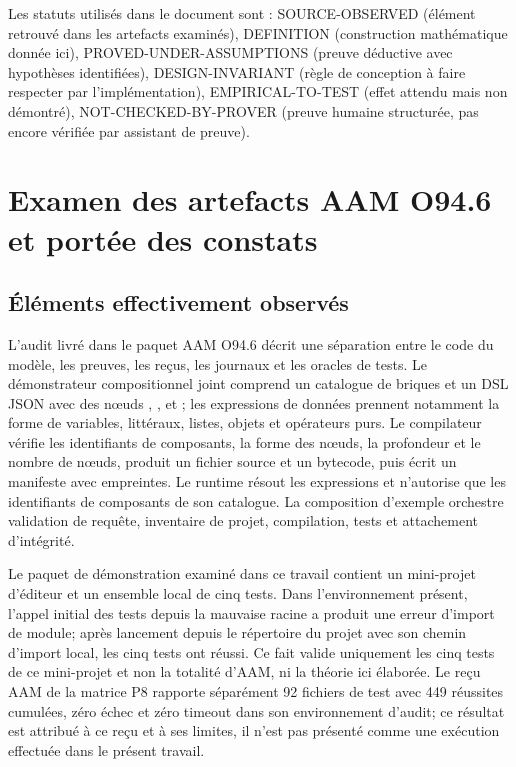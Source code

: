 \documentclass[11pt,a4paper]{article}
\newcommand{\code}[1]{\path{#1}}
\newcommand{\kw}[1]{\textsf{#1}}
\theoremstyle{definition}
\theoremstyle{plain}
\theoremstyle{remark}
\begin{document}
Les statuts utilisés dans le document sont : \kw{SOURCE-OBSERVED} (élément retrouvé dans les artefacts examinés), \kw{DEFINITION} (construction mathématique donnée ici), \kw{PROVED-UNDER-ASSUMPTIONS} (preuve déductive avec hypothèses identifiées), \kw{DESIGN-INVARIANT} (règle de conception à faire respecter par l'implémentation), \kw{EMPIRICAL-TO-TEST} (effet attendu mais non démontré), \kw{NOT-CHECKED-BY-PROVER} (preuve humaine structurée, pas encore vérifiée par assistant de preuve).

\section{Examen des artefacts AAM O94.6 et portée des constats}
\subsection{Éléments effectivement observés}
L'audit livré dans le paquet AAM O94.6 décrit une séparation entre le code du modèle, les preuves, les reçus, les journaux et les oracles de tests. Le démonstrateur compositionnel joint comprend un catalogue de briques et un DSL JSON avec des nœuds \code{invoke}, \code{sequence}, \code{condition} et \code{map}; les expressions de données prennent notamment la forme de variables, littéraux, listes, objets et opérateurs purs. Le compilateur vérifie les identifiants de composants, la forme des nœuds, la profondeur et le nombre de nœuds, produit un fichier source et un bytecode, puis écrit un manifeste avec empreintes. Le runtime résout les expressions et n'autorise que les identifiants de composants de son catalogue. La composition d'exemple orchestre validation de requête, inventaire de projet, compilation, tests et attachement d'intégrité.

Le paquet de démonstration examiné dans ce travail contient un mini-projet d'éditeur et un ensemble local de cinq tests. Dans l'environnement présent, l'appel initial des tests depuis la mauvaise racine a produit une erreur d'import de module; après lancement depuis le répertoire du projet avec son chemin d'import local, les cinq tests ont réussi. Ce fait valide uniquement les cinq tests de ce mini-projet et non la totalité d'AAM, ni la théorie ici élaborée. Le reçu AAM de la matrice P8 rapporte séparément 92 fichiers de test avec 449 réussites cumulées, zéro échec et zéro timeout dans son environnement d'audit; ce résultat est attribué à ce reçu et à ses limites, il n'est pas présenté comme une exécution effectuée dans le présent travail.
\end{document}
